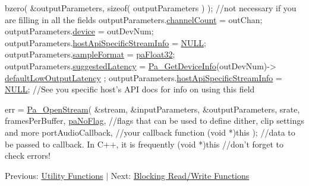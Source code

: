 \begin{DoxyCode}
bzero( &outputParameters, \textcolor{keyword}{sizeof}( outputParameters ) ); \textcolor{comment}{//not necessary if you are filling in all the
       fields}
outputParameters.\hyperlink{struct_pa_stream_parameters_a861ff361da71fc2572dd356c9c9878ca}{channelCount} = outChan;
outputParameters.\hyperlink{struct_pa_stream_parameters_aebaf648b4d11dd1252a747b76b8da084}{device} = outDevNum;
outputParameters.\hyperlink{struct_pa_stream_parameters_aff01b9fa0710ad1654471e97665c06a9}{hostApiSpecificStreamInfo} = \hyperlink{getopt1_8c_a070d2ce7b6bb7e5c05602aa8c308d0c4}{NULL};
outputParameters.\hyperlink{struct_pa_stream_parameters_ad8d2d3063757b812f9e5f8709f41052b}{sampleFormat} = \hyperlink{portaudio_8h_a2f16d29916725b8791eae60ab9e0b081}{paFloat32};
outputParameters.\hyperlink{struct_pa_stream_parameters_aa1e80ac0551162fd091db8936ccbe9a0}{suggestedLatency} = \hyperlink{portaudio_8h_ac7d8e091ffc1d1d4a035704660e117eb}{Pa\_GetDeviceInfo}(outDevNum)->
      \hyperlink{struct_pa_device_info_a89e60515505eea8d668ede3a26a19ac6}{defaultLowOutputLatency} ;
outputParameters.\hyperlink{struct_pa_stream_parameters_aff01b9fa0710ad1654471e97665c06a9}{hostApiSpecificStreamInfo} = \hyperlink{getopt1_8c_a070d2ce7b6bb7e5c05602aa8c308d0c4}{NULL}; \textcolor{comment}{//See you specific host's
       API docs for info on using this field}

err = \hyperlink{portaudio_8h_a443ad16338191af364e3be988014cbbe}{Pa\_OpenStream}(
                &stream,
                &inputParameters,
                &outputParameters,
                srate,
                framesPerBuffer,
                \hyperlink{portaudio_8h_ad33384abe3754a39f4773f2561773595}{paNoFlag}, \textcolor{comment}{//flags that can be used to define dither, clip settings and more}
                portAudioCallback, \textcolor{comment}{//your callback function}
                (\textcolor{keywordtype}{void} *)\textcolor{keyword}{this} ); \textcolor{comment}{//data to be passed to callback. In C++, it is frequently (void *)this}
\textcolor{comment}{//don't forget to check errors!}
\end{DoxyCode}


Previous\+: \hyperlink{utility_functions}{Utility Functions} $\vert$ Next\+: \hyperlink{blocking_read_write}{Blocking Read/\+Write Functions} 